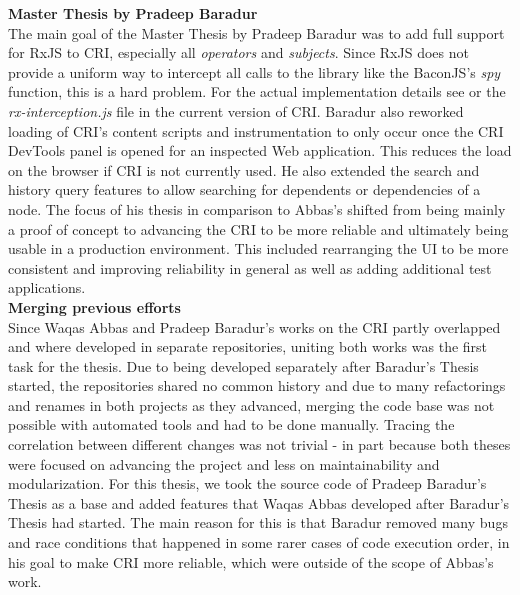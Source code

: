 	\textbf{Master Thesis by Pradeep Baradur}\\
	 \cite{ThesisBaradur} The main goal of the Master Thesis by Pradeep Baradur was to add full support for RxJS to CRI, especially all \emph{operators} and \emph{subjects}. Since RxJS does not provide a uniform way to intercept all calls to the library like the BaconJS's \emph{spy} function, this is a hard problem. For the actual implementation details see \cite{ThesisBaradur} or the \emph{rx-interception.js} file in the current version of CRI. Baradur also reworked loading of CRI's content scripts and instrumentation to only occur once the CRI DevTools panel is opened for an inspected Web application. This reduces the load on the browser if CRI is not currently used. He also extended the search and history query features to allow searching for dependents or dependencies of a node. The focus of his thesis in comparison to Abbas's shifted from being mainly a proof of concept to advancing the CRI to be more reliable and ultimately being usable in a production environment. This included rearranging the UI to be more consistent and improving reliability in general as well as adding additional test applications.\\		
		
	\textbf{Merging previous efforts}\\
	Since Waqas Abbas and Pradeep Baradur's works on the CRI partly overlapped and where developed in separate repositories, uniting both works was the first task for the thesis. Due to being developed separately after Baradur's Thesis started, the repositories shared no common history and due to many refactorings and renames in both projects as they advanced, merging the code base was not possible with automated tools and had to be done manually. Tracing the correlation between different changes was not trivial - in part because both theses were focused on advancing the project and less on maintainability and modularization. For this thesis, we took the source code of Pradeep Baradur's Thesis as a base and added features that Waqas Abbas developed after Baradur's Thesis had started. The main reason for this is that Baradur removed many bugs and race conditions that happened in some rarer cases of code execution order, in his goal to make CRI more reliable, which were outside of the scope of Abbas's work.
		
